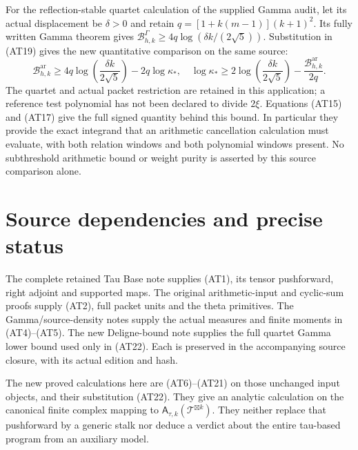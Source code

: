 \documentclass{article}
\newcommand{\ar}{\mathrm{ar}}
\newcommand{\Ga}{\Gamma}
\begin{document}
For the reflection-stable quartet calculation of the supplied
Gamma audit, let its actual displacement be $\delta>0$ and
retain $q=[1+k(m-1)](k+1)^2$. Its fully written Gamma theorem
gives $\mathcal B^\Ga_{h,k}\ge
4q\log(\delta k/(2\sqrt5))$. Substitution in (AT19) gives the
new quantitative comparison on the same source:
\[
 \mathcal B^\ar_{h,k}\ge
 4q\log\!\left(\frac{\delta k}{2\sqrt5}\right)-2q\log\kappa_*,
 \quad
 \log\kappa_*\ge
 2\log\!\left(\frac{\delta k}{2\sqrt5}\right)
       -\frac{\mathcal B^\ar_{h,k}}{2q}.                   \tag{AT22}
\]
The quartet and actual packet restriction are retained in this
application; a reference test polynomial has not been declared
to divide $2\xi$. Equations (AT15) and (AT17) give the full
signed quantity behind this bound. In particular they provide
the exact integrand that an arithmetic cancellation calculation
must evaluate, with both relation windows and both polynomial
windows present. No subthreshold arithmetic bound or weight
purity is asserted by this source comparison alone.

\section{Source dependencies and precise status}

The complete retained Tau Base note supplies (AT1), its tensor
pushforward, right adjoint and supported maps. The original
arithmetic-input and cyclic-sum proofs supply (AT2), full packet
units and the theta primitives. The Gamma/source-density notes
supply the actual measures and finite moments in (AT4)--(AT5).
The new Deligne-bound note supplies the full quartet Gamma
lower bound used only in (AT22). Each is preserved in the
accompanying source closure, with its actual edition and hash.

The new proved calculations here are (AT6)--(AT21) on those
unchanged input objects, and their substitution (AT22). They
give an analytic calculation on the canonical finite complex
mapping to $\mathsf A_{\tau,k}(\mathcal T^{\boxtimes k})$.
They neither replace that pushforward by a generic stalk nor
deduce a verdict about the entire tau-based program from an
auxiliary model.
\end{document}
